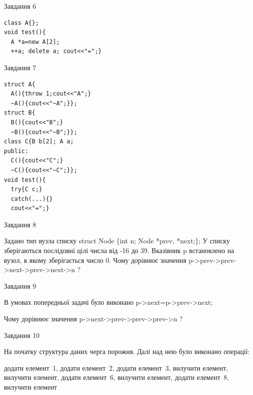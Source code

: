 \documentclass[12pt, ukrainian]{article}
\begin{document}
{{{{{{{{{{{{{{{{{\begin{minipage}[t]{7cm}
               
{\begin{center}Завдання {6}\end{center}}
\vspace{-6mm}

\begin{verbatim}
class A{};
void test(){
  A *a=new A[2]; 
  ++a; delete a; cout<<"=";} 
\end{verbatim}            


               
{\begin{center}Завдання {7}\end{center}}
\vspace{-6mm}

\begin{verbatim}
struct A{
  A(){throw 1;cout<<"A";}
  ~A(){cout<<"~A";}};
struct B{
  B(){cout<<"B";}
  ~B(){cout<<"~B";}};
class C{B b[2]; A a;
public:
  C(){cout<<"C";}
  ~C(){cout<<"~C";}};
void test(){
  try{C c;} 
  catch(...){} 
  cout<<"=";}
\end{verbatim}            


\end{minipage}
               
{\begin{center}Завдання {8}\end{center}}
\vspace{-6mm}
Задано тип вузла списку
struct Node \{int n; Node *prev, *next;\};
У списку зберігаються послідовні цілі числа від -16 до 39. Вказівник p встановлено на вузол, в якому зберігається число 0.
Чому дорівнює значення p->prev->prev->next->prev->next->n ?\par

               
{\begin{center}Завдання {9}\end{center}}
\vspace{-6mm}
В умовах попередньої задачі було виконано p->next=p->prev->next;

Чому дорівнює значення p->next->prev->prev->prev->n ?\par

\newpage
               
{\begin{center}Завдання {10}\end{center}}
\vspace{-6mm}
На початку структура даних черга порожня. Далі над нею було виконано операції:

додати елемент~1, додати елемент~2, додати елемент~3, вилучити елемент, вилучити елемент, додати елемент~6, вилучити елемент, додати елемент~8, вилучити елемент

}}}}}}}}}}}}}}}}}
\end{document}
